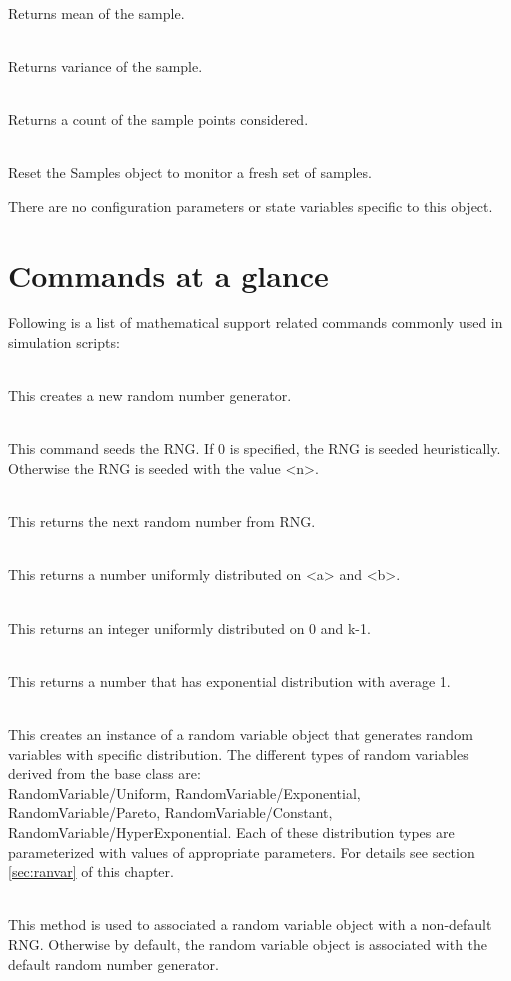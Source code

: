 \\
Returns mean of the sample. 

\\
Returns variance of the sample. 

\\
Returns a count of the sample points considered. 

\\
Reset the Samples object to monitor a fresh set of samples. 

There are no configuration parameters or state variables specific to this
object. 



\section{Commands at a glance}
\label{sec:mathcommand}

Following is a list of mathematical support related commands commonly used
in simulation scripts:
\begin{flushleft}
\\
This creates a new random number generator.


\\
This command seeds the RNG. If 0 is specified, the RNG is seeded
heuristically. Otherwise the RNG is seeded with the value <n>.


\\
This returns the next random number from RNG.


\\
This returns a number uniformly distributed on <a> and <b>.


\\
This returns an integer uniformly distributed on 0 and k-1.


\\
This returns a number that has exponential distribution with average 1.


\\
This creates an instance of a random variable object that generates random 
variables with specific distribution. The different types of random 
variables derived from the base class are:\\
RandomVariable/Uniform, RandomVariable/Exponential, RandomVariable/Pareto,
RandomVariable/Constant, RandomVariable/HyperExponential.
Each of these distribution types are parameterized with values of
appropriate parameters. For details see section \ref{sec:ranvar} of this
chapter.


\\
This method is used to associated a random variable object with a
non-default RNG. Otherwise by default, the random variable object is
associated with the default random number generator.


\end{flushleft}




